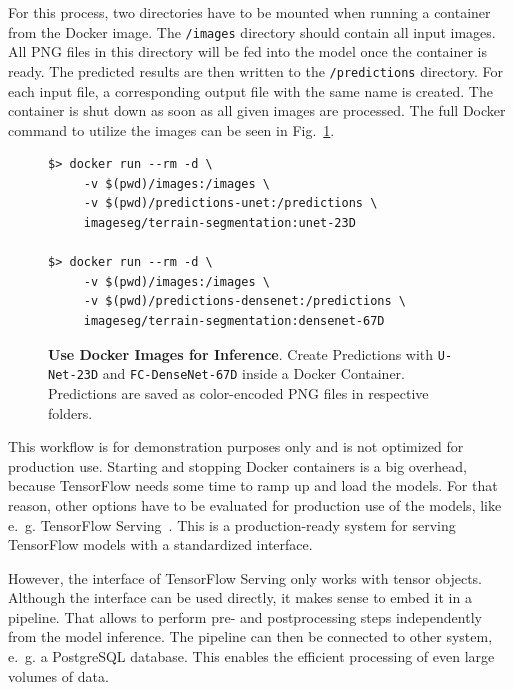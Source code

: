 For this process, two directories have to be mounted when running a container from the Docker image. The \texttt{/images} directory should contain all input images. All PNG files in this directory will be fed into the model once the container is ready. The predicted results are then written to the \texttt{/predictions} directory. For each input file, a corresponding output file with the same name is created. The container is shut down as soon as all given images are processed. The full Docker command to utilize the images can be seen in Fig.~\ref{fig:docker_inference}.

\begin{figure}[h]
\begin{lstlisting}
$> docker run --rm -d \
     -v $(pwd)/images:/images \
     -v $(pwd)/predictions-unet:/predictions \
     imageseg/terrain-segmentation:unet-23D

$> docker run --rm -d \
     -v $(pwd)/images:/images \
     -v $(pwd)/predictions-densenet:/predictions \
     imageseg/terrain-segmentation:densenet-67D
\end{lstlisting}
\caption[Use Docker Images for Inference]
{\textbf{Use Docker Images for Inference}. Create Predictions with \texttt{U-Net-23D} and \texttt{FC-DenseNet-67D} inside a Docker Container. Predictions are saved as color-encoded PNG files in respective folders.}
\label{fig:docker_inference}
\end{figure}

This workflow is for demonstration purposes only and is not optimized for production use. Starting and stopping Docker containers is a big overhead, because TensorFlow needs some time to ramp up and load the models. For that reason, other options have to be evaluated for production use of the models, like e.~g. TensorFlow Serving~\cite{tf_serving20}. This is a production-ready system for serving TensorFlow models with a standardized interface.

However, the interface of TensorFlow Serving only works with tensor objects. Although the interface can be used directly, it makes sense to embed it in a pipeline. That allows to perform pre- and postprocessing steps independently from the model inference. The pipeline can then be connected to other system, e.~g. a PostgreSQL database. This enables the efficient processing of even large volumes of data.

\clearpage
